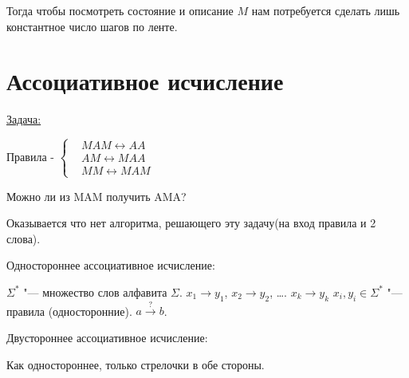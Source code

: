 Тогда чтобы посмотреть состояние и описание $M$ нам потребуется сделать лишь константное число шагов по ленте.

\section{Ассоциативное исчисление}
\underline{Задача:}

Правила - $\left\{
	\begin{aligned}
	&MAM \longleftrightarrow AA \\
	&AM \longleftrightarrow MAA \\
	&MM \longleftrightarrow MAM 
	\end{aligned}
\right.$

Можно ли из MAM получить AMA? 

Оказывается что нет алгоритма, решающего эту задачу(на вход правила и 2 слова).

\begin{Def}
	Одностороннее ассоциативное исчисление:
	
	$\Sigma^{*}$ "--- множество слов алфавита $\Sigma$.
	$x_1 \rightarrow y_1$, $x_2 \rightarrow y_2$, \dots. $x_k \rightarrow y_k$
	$x_i, y_i \in \Sigma^{*}$ "--- правила (односторонние).
	$a \xrightarrow{?} b$.

    Двустороннее ассоциативное исчисление:

    Как одностороннее, только стрелочки в обе стороны.
\end{Def}

